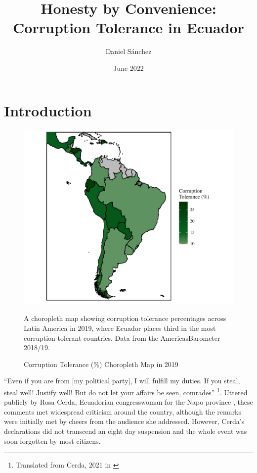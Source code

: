 \documentclass[12pt,a4]{article}
\title{Honesty by Convenience: Corruption Tolerance in Ecuador}
\author{Daniel Sánchez}
\date{June 2022}
\begin{document}

\section{Introduction}



\begin{figure}[htbp!]
    \begin{center}
    \includegraphics[scale = 0.8]{images/ctol_map.pdf}
    \end{center}
    \caption{Corruption Tolerance (\%) Choropleth Map in 2019}
    \label{fig:ctolmap}
A choropleth map showing corruption tolerance percentages across Latin America in 2019, where Ecuador places third in the most corruption tolerant countries. Data from the \textregistered AmericasBarometer 2018/19. 
\end{figure}

\enquote{Even if you are from [my political party], I will fulfill my duties. If you steal, steal well!  Justify well! But do not let your affairs be seen, comrades} \footnote{Translated from Cerda, 2021 in \cite[para. 2]{PlanV.2021}}. Uttered publicly by Rosa Cerda, Ecuadorian congresswoman for the Napo province \parencite{Castro.2021}, these comments met widespread criticism around the country, although the remarks were initially met by cheers from the audience she addressed. However, Cerda's declarations did not transcend an eight day suspension \parencite{Ordonez.2021} and the whole event was soon forgotten by most citizens. 
\end{document}
